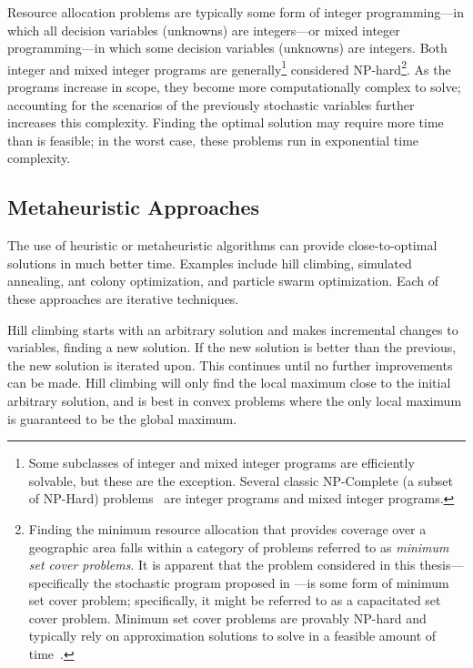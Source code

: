 \documentclass[12pt,dvipsnames]{report}
\begin{document}
Resource allocation problems are typically some form of integer programming---in which all decision variables (unknowns) are integers---or mixed integer programming---in which some decision variables (unknowns) are integers.  Both integer and mixed integer programs are generally\footnote{Some subclasses of integer and mixed integer programs are efficiently solvable, but these are the exception.  Several classic NP-Complete (a subset of NP-Hard) problems~\cite{Karp1972} are integer programs and mixed integer programs.} considered NP-hard\footnote{Finding the minimum resource allocation that provides coverage over a geographic area falls within a category of problems referred to as \emph{minimum set cover problems}.  It is apparent that the problem considered in this thesis---specifically the stochastic program proposed in ---is some form of minimum set cover problem; specifically, it might be referred to as a capacitated set cover problem.  Minimum set cover problems are provably NP-hard and typically rely on approximation solutions to solve in a feasible amount of time~\cite{Korte:2007:CombOptimization}.}.  As the programs increase in scope, they become more computationally complex to solve; accounting for the scenarios of the previously stochastic variables further increases this complexity.  Finding the optimal solution may require more time than is feasible; in the worst case, these problems run in exponential time complexity.

\subsection{Metaheuristic Approaches} \label{subsec:optreview_meta}

The use of heuristic or metaheuristic algorithms can provide close-to-optimal solutions in much better time.  Examples include hill climbing, simulated annealing, ant colony optimization, and particle swarm optimization.  Each of these approaches are iterative techniques.

Hill climbing starts with an arbitrary solution and makes incremental changes to variables, finding a new solution.  If the new solution is better than the previous, the new solution is iterated upon.  This continues until no further improvements can be made.  Hill climbing will only find the local maximum close to the initial arbitrary solution, and is best in convex problems where the only local maximum is guaranteed to be the global maximum.
\end{document}

